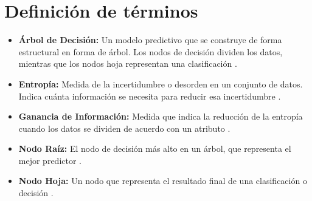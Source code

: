 \section{Definición de términos}

\begin{itemize}
    \item \textbf{Árbol de Decisión:} Un modelo predictivo que se construye de forma estructural en forma de árbol. Los nodos de decisión dividen los datos, mientras que los nodos hoja representan una clasificación \parencite{Bhandari1997}.
    \item \textbf{Entropía:} Medida de la incertidumbre o desorden en un conjunto de datos. Indica cuánta información se necesita para reducir esa incertidumbre \parencite{Bhandari1997}.
    \item \textbf{Ganancia de Información:} Medida que indica la reducción de la entropía cuando los datos se dividen de acuerdo con un atributo \parencite{Bhandari1997}.
    \item \textbf{Nodo Raíz:} El nodo de decisión más alto en un árbol, que representa el mejor predictor \parencite{Bhandari1997}.
    \item \textbf{Nodo Hoja:} Un nodo que representa el resultado final de una clasificación o decisión \parencite{Bhandari1997}.
\end{itemize}
